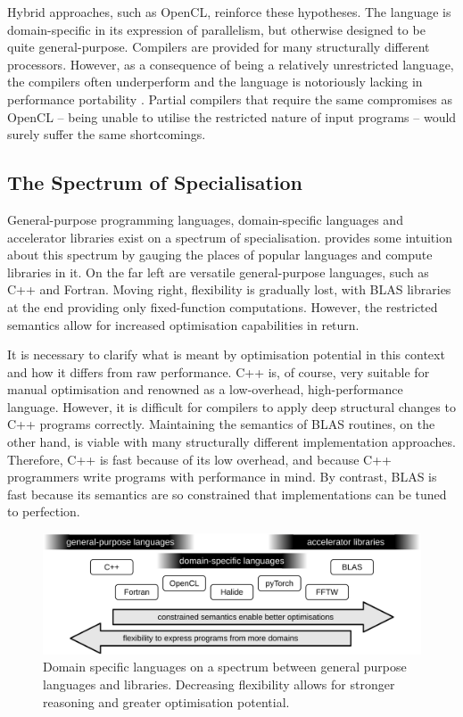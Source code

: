     Hybrid approaches, such as OpenCL, reinforce these hypotheses.
    The language is domain-specific in its expression of parallelism, but
    otherwise designed to be quite general-purpose.
    Compilers are provided for many structurally different processors.
    However, as a consequence of being a relatively unrestricted language, the
    compilers often underperform and the language is notoriously lacking in
    performance portability \citep{Falch:2015:MLB:2863697.2864570}.
    Partial compilers that require the same compromises as OpenCL -- being
    unable to utilise the restricted nature of input programs -- would surely
    suffer the same shortcomings.

\subsection{The Spectrum of Specialisation}

    General-purpose programming languages, domain-specific languages and
    accelerator libraries exist on a spectrum of specialisation.
     provides some intuition about this spectrum by
    gauging the places of popular languages and compute libraries in it.
    On the far left are versatile general-purpose languages, such as C++ and
    Fortran.
    Moving right, flexibility is gradually lost, with BLAS libraries at
    the end providing only fixed-function computations.
    However, the restricted semantics allow for increased optimisation
    capabilities in return.

    It is necessary to clarify what is meant by optimisation potential in this
    context and how it differs from raw performance.
    C++ is, of course, very suitable for manual optimisation and renowned as a
    low-overhead, high-performance language.
    However, it is difficult for compilers to apply deep structural changes to
    C++ programs correctly.
    Maintaining the semantics of BLAS routines, on the other hand, is viable
    with many structurally different implementation approaches.
    Therefore, C++ is fast because of its low overhead, and because C++
    programmers write programs with performance in mind.
    By contrast, BLAS is fast because its semantics are so constrained that
    implementations can be tuned to perfection.

\begin{figure}[t]
\centering
\includegraphics[width=\textwidth]{figures/DSLgradient}
\caption{Domain specific languages on a spectrum between general purpose
         languages and libraries.
         Decreasing flexibility allows for stronger reasoning and greater
         optimisation potential.}
\label{specialgradient}
\end{figure}

